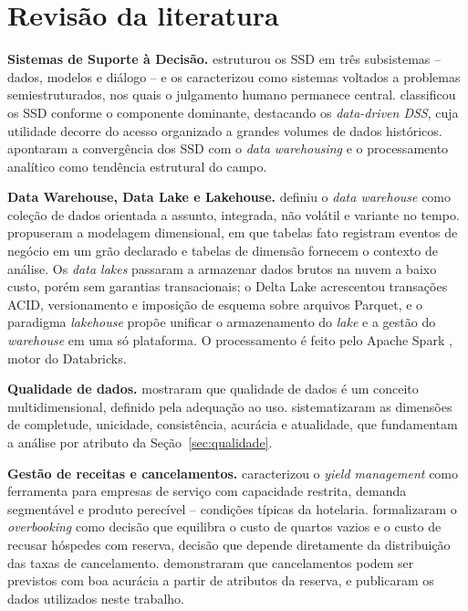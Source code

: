 \documentclass[11pt,a4paper]{article}
\begin{document}
\section{Revisão da literatura}\label{sec:revisao}

\textbf{Sistemas de Suporte à Decisão.} \citet{sprague1980} estruturou os SSD em três subsistemas -- dados, modelos e diálogo -- e os caracterizou como sistemas voltados a problemas semiestruturados, nos quais o julgamento humano permanece central. \citet{power2002} classificou os SSD conforme o componente dominante, destacando os \textit{data-driven DSS}, cuja utilidade decorre do acesso organizado a grandes volumes de dados históricos. \citet{shim2002} apontaram a convergência dos SSD com o \textit{data warehousing} e o processamento analítico como tendência estrutural do campo.

\textbf{Data Warehouse, Data Lake e Lakehouse.} \citet{inmon2005} definiu o \textit{data warehouse} como coleção de dados orientada a assunto, integrada, não volátil e variante no tempo. \citet{kimball2013} propuseram a modelagem dimensional, em que tabelas fato registram eventos de negócio em um grão declarado e tabelas de dimensão fornecem o contexto de análise. Os \textit{data lakes} passaram a armazenar dados brutos na nuvem a baixo custo, porém sem garantias transacionais; o Delta Lake \citep{armbrust2020} acrescentou transações ACID, versionamento e imposição de esquema sobre arquivos Parquet, e o paradigma \textit{lakehouse} \citep{armbrust2021} propõe unificar o armazenamento do \textit{lake} e a gestão do \textit{warehouse} em uma só plataforma. O processamento é feito pelo Apache Spark \citep{zaharia2016}, motor do Databricks.

\textbf{Qualidade de dados.} \citet{wang1996} mostraram que qualidade de dados é um conceito multidimensional, definido pela adequação ao uso. \citet{batini2006} sistematizaram as dimensões de completude, unicidade, consistência, acurácia e atualidade, que fundamentam a análise por atributo da Seção~\ref{sec:qualidade}.

\textbf{Gestão de receitas e cancelamentos.} \citet{kimes1989} caracterizou o \textit{yield management} como ferramenta para empresas de serviço com capacidade restrita, demanda segmentável e produto perecível -- condições típicas da hotelaria. \citet{talluri2004} formalizaram o \textit{overbooking} como decisão que equilibra o custo de quartos vazios e o custo de recusar hóspedes com reserva, decisão que depende diretamente da distribuição das taxas de cancelamento. \citet{antonio2017} demonstraram que cancelamentos podem ser previstos com boa acurácia a partir de atributos da reserva, e \citet{antonio2019} publicaram os dados utilizados neste trabalho.
\end{document}
